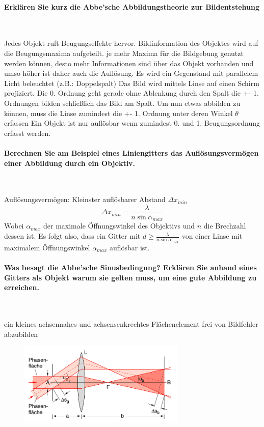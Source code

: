 \documentclass[a4paper, 11pt, ngerman, parskip=half-]{scrartcl}
\begin{document}
    \paragraph{Erklären Sie kurz die Abbe'sche Abbildungstheorie zur Bildentstehung} ~

    Jedes Objekt ruft Beugungseffekte hervor. Bildinformation des Objektes wird auf die Beugungsmaxima aufgeteilt. je mehr Maxima für die Bildgebung genutzt werden können, desto mehr Informationen sind über das Objekt vorhanden und umso höher ist daher auch die Auflösung.
    Es wird ein Gegenstand mit parallelem Licht beleuchtet (z.B.: Doppelspalt)
    Das Bild wird mittels Linse auf einen Schirm projiziert. Die 0. Ordnung geht gerade ohne Ablenkung durch den Spalt die +- 1. Ordnungen bilden schließlich das Bild am Spalt. Um nun etwas abbilden zu können, muss die Linse zumindest die +- 1. Ordnung unter deren Winkel $\theta$ erfassen
    Ein Objekt ist nur auflösbar wenn zumindest 0. und 1. Beugungsordnung erfasst werden.

    \paragraph{Berechnen Sie am Beispiel eines Liniengitters das Auflösungsvermögen einer Abbildung
        durch ein Objektiv.} ~

    Auflösungsvermögen: Kleinster auflösbarer Abstand $\Delta x_{min}$
    \begin{equation}
        \Delta x_{min} = \frac{\lambda}{n \sin \alpha_{max}}
    \end{equation}
    Wobei $\alpha_{max}$ der maximale Öffnungswinkel des Objektivs und $n$ die Brechzahl dessen ist.
    Es folgt also, dass ein Gitter mit $d \geq \frac{\lambda}{n \sin \alpha_{max}}$ von einer Linse mit maximalem Öffnungswinkel $\alpha_{max}$
    auflösbar ist.

    \paragraph{Was besagt die Abbe'sche Sinusbedingung? Erklären Sie anhand eines Gitters als Objekt
        warum sie gelten muss, um eine gute Abbildung zu erreichen.} ~

    ein kleines achsennahes und achsensenkrechtes Flächenelement frei von Bildfehler abzubilden

    \begin{figure}[H]
        \centering
        \includegraphics[width=8cm]{image/22/opt23}
    \end{figure}
\end{document}
